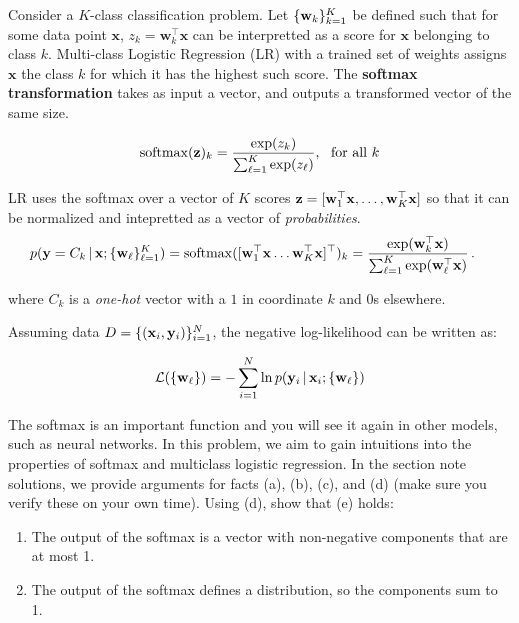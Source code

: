 \documentclass[12pt,letterpaper]{article}
\begin{document}
\begin{enumerate}
{{Consider a $K$-class classification problem.
Let $\{\mathbf{w}_k\}_{k=1}^K$ be defined such that for some data 
point $\mathbf{x}$, $z_k = \mathbf{w}_k^\top\mathbf{x}$ can be interpretted as a 
score for $\mathbf{x}$ belonging to class $k$. Multi-class Logistic Regression (LR) with a trained 
set of weights assigns $\mathbf{x}$ the class $k$ for which
it has the highest such score. The \textbf{softmax transformation} takes as input a vector, and
outputs a transformed vector of the same size.

\[ \mathrm{softmax}(\mathbf{z})_k =\frac{\exp(z_k)}{\sum_{\ell=1}^K \exp(z_{\ell})}, \ \ \text{for all $k$}\]

LR uses the softmax over a vector of $K$ scores
$\mathbf{z} = [\mathbf{w}_1^\top\mathbf{x}, \ldots, \mathbf{w}_K^\top\mathbf{x}]$ so that it can be normalized
and intepretted as a vector of \textit{probabilities}.
  \begin{align*}
    p(\mathbf{y}=C_k \,|\, \mathbf{x}; \{\mathbf{w}_{\ell}\}_{\ell=1}^K)
    &= \mathrm{softmax}([\mathbf{w}_1^{\top}\mathbf{x} \ldots \mathbf{w}_K^{\top} \mathbf{x}]^\top)_k =  \frac{ \exp( \mathbf{w}_k^{\top}\mathbf{x} ) }
    {  \sum_{\ell=1}^K \exp( \mathbf{w}_{\ell}^{\top}\mathbf{x} ) }\,.
  \end{align*}

\noindent where $C_k$ is a \textit{one-hot} vector with a $1$ in coordinate $k$ and $0$s elsewhere.

  Assuming data $D = \{(\mathbf{x}_i, \mathbf{y}_i)\}_{i=1}^N$,
  the negative log-likelihood can be written as:

  \[\mathcal{L}(\{\mathbf{w}_{\ell}\}) = - \sum_{i=1}^N \ln p(\mathbf{y}_i \,|\, \mathbf{x}_i; \{\mathbf{w}_{\ell}\}) \]

  The softmax is an important function and you will see it again in other models, such as neural networks.
  In this problem, we aim to gain intuitions into the properties of
  softmax and multiclass logistic regression. In the section note solutions,
  we provide arguments for facts (a), (b), (c), and (d) (make sure you verify
  these on your own time). Using (d), show that (e) holds:\\

  \begin{enumerate}
      \item The output of the softmax is a vector with non-negative components
      that are at most 1. 

      \item The output of the softmax defines a distribution, so the components sum to 1.


\end{enumerate}}}
\end{enumerate}
\end{document}
